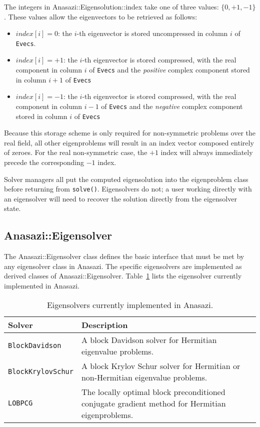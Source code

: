 The integers in Anasazi::Eigensolution::index take one of three values: $\{0, +1, -1\}$.
These values allow the eigenvectors to be retrieved as follows:
\begin{itemize}
  \item $index[i]=0$: the $i$-th eigenvector is stored uncompressed in column $i$ of
    \verb!Evecs!.
  \item $index[i]=+1$: the $i$-th eigenvector is stored compressed, with the real
    component in column $i$ of \verb!Evecs! and the \emph{positive} complex component
    stored in column $i+1$ of \verb!Evecs!
  \item $index[i]=-1$: the $i$-th eigenvector is stored compressed, with the real
    component in column $i-1$ of \verb!Evecs! and the \emph{negative} complex component
    stored in column $i$ of \verb!Evecs!
\end{itemize}
Because this storage scheme is only required for non-symmetric problems over the real
field, all other eigenproblems will result in an index vector composed entirely of zeroes.
For the real non-symmetric case, the $+1$ index will always immediately precede the
corresponding $-1$ index.

\begin{remark}
  Solver managers all put the computed eigensolution into the eigenproblem class before
  returning from \verb!solve()!. Eigensolvers do not; a user working directly with an
  eigensolver will need to recover the solution directly from the eigensolver state.
\end{remark}

\subsection{Anasazi::Eigensolver}
\label{sec:anasazi:eigensolver}

The Anasazi::Eigensolver class defines the basic interface that must be
met by any eigensolver class in Anasazi. The specific eigensolvers are
implemented as derived classes of Anasazi::Eigensolver.
Table~\ref{tab:anasazi:solvers} lists the eigensolver currently implemented in
Anasazi.

\begin{table}[htp]
\begin{center}
\begin{tabular}{| p{4cm} p{10cm} |}
\hline
Solver & Description \\
\hline
{\tt BlockDavidson}    & A block Davidson solver for Hermitian
                         eigenvalue problems.\\
{\tt BlockKrylovSchur} & A block Krylov Schur solver for Hermitian or
                         non-Hermitian eigenvalue problems.\\
{\tt LOBPCG} & The locally optimal block preconditioned conjugate gradient
method for Hermitian eigenproblems.\\
\hline
\end{tabular}
\caption{Eigensolvers currently implemented in Anasazi.}
\label{tab:anasazi:solvers}
\end{center}
\end{table}

